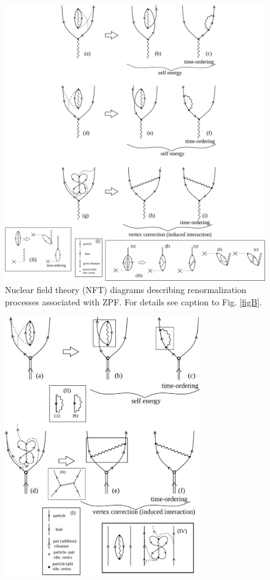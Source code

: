 \begin{subappendices}
\begin{figure}[h!]
\begin{center}
\includegraphics*[width=1.2\textwidth]{C7/figs_C7/FigA.pdf}
\end{center}
\caption{Nuclear field theory (NFT) diagrams describing renormalization processes associated with ZPF. For details see caption to Fig. \ref{figB}.}\label{figA}
\end{figure}
 \begin{figure}[h!]
 	\begin{center}
\includegraphics*[width=0.75\textwidth]{C7/figs_C7/FigB.pdf}

\end{center}
\end{figure}
\end{subappendices}

